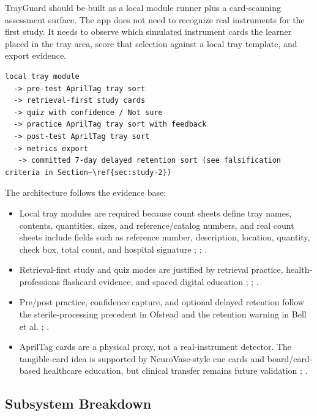 \documentclass[10pt,a4paper]{article}
\begin{document}
TrayGuard should be built as a local module runner plus a card-scanning
assessment surface. The app does not need to recognize real instruments for the
first study. It needs to observe which simulated instrument cards the learner
placed in the tray area, score that selection against a local tray template,
and export evidence.
\begin{lstlisting}
local tray module
  -> pre-test AprilTag tray sort
  -> retrieval-first study cards
  -> quiz with confidence / Not sure
  -> practice AprilTag tray sort with feedback
  -> post-test AprilTag tray sort
  -> metrics export
   -> committed 7-day delayed retention sort (see falsification criteria in Section~\ref{sec:study-2})
\end{lstlisting}
The architecture follows the evidence base:
\begin{itemize}
  \item Local tray modules are required because count sheets define tray names, contents, quantities, sizes, and reference/catalog numbers, and real count sheets include fields such as reference number, description, location, quantity, check box, total count, and hospital signature \cite{nadeau-2024}; \cite{stryker-gamma4-count-sheet-2023}; \cite{stryker-imn-count-sheet-2023}.
  \item Retrieval-first study and quiz modes are justified by retrieval practice, health-professions flashcard evidence, and spaced digital education \cite{roediger-and-karpicke-2006}; \cite{barrison-et-al-2025}; \cite{martinengo-et-al-2024}.
  \item Pre/post practice, confidence capture, and optional delayed retention follow the sterile-processing precedent in Ofstead and the retention warning in Bell et al. \cite{ofstead-et-al-2023}; \cite{bell-et-al-2008}.
   \item AprilTag cards are a physical proxy, not a real-instrument detector. The tangible-card idea is supported by NeuroVase-style cue cards and board/card-based healthcare education, but clinical transfer remains future validation \cite{jahani-et-al-2026-neurovase}; \cite{ward-et-al-2019}.
\end{itemize}
\subsection{Subsystem Breakdown}
\end{document}
